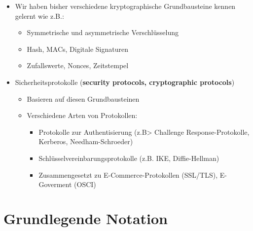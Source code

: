\documentclass[openany]{book}
\begin{document}
\begin{itemize}
    \item Wir haben bisher verschiedene kryptographische Grundbausteine kennen gelernt wie z.B.:
    \begin{itemize}
        \item Symmetrische und asymmetrische Verschlüsselung
        \item Hash, MACs, Digitale Signaturen
        \item Zufallswerte, Nonces, Zeitstempel
    \end{itemize}
    \item Sicherheitsprotokolle (\textbf{security protocols, cryptographic protocols})
    \begin{itemize}
        \item Basieren auf diesen Grundbausteinen
        \item Verschiedene Arten von Protokollen:
        \begin{itemize}
            \item Protokolle zur Authentisierung (z.B> Challenge Response-Protokolle, Kerberos, Needham-Schroeder)
            \item Schlüsselvereinbarungsprotokolle (z.B. IKE, Diffie-Hellman)
            \item Zusammengesetzt zu E-Commerce-Protokollen (SSL/TLS), E-Goverment (OSCI)
        \end{itemize}
    \end{itemize}
\end{itemize}

\section{Grundlegende Notation}
\end{document}
